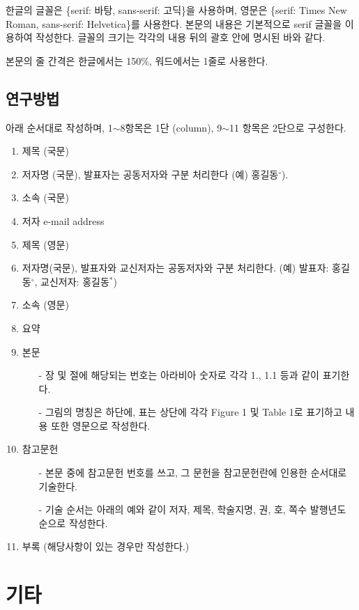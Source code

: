 \documentclass[a4paper,twocolumn]{article}
\begin{document}
한글의 글꼴은 \{serif: 바탕, sans-serif: 고딕\}을 사용하며, 
영문은 \{serif: Times New Roman, sans-serif: Helvetica\}를 사용한다. 
본문의 내용은 기본적으로 serif 글꼴을 이용하여 작성한다.
글꼴의 크기는 각각의 내용 뒤의 괄호 안에 명시된 바와 같다.

본문의 줄 간격은 한글에서는 150\%, 워드에서는 1줄로 사용한다.


\subsection{연구방법}
\label{subsec:methods}

아래 순서대로 작성하며, 1$\sim$8항목은 1단 (column), 
9$\sim$11 항목은 2단으로 구성한다.

\begin{enumerate}
	\item 제목 (국문)
	\item 저자명 (국문), 발표자는 공동저자와 구분 처리한다 (예) 홍길동$^{\circ}$).
	\item 소속 (국문)
	\item 저자 e-mail address
	\item 제목 (영문)
	\item 저자명(국문), 발표자와 교신저자는 공동저자와 구분 처리한다. (예) 발표자: 홍길동$^{\circ}$, 교신저자: 홍길동$^{*}$)
	\item 소속 (영문)
	\item 요약
	\item 본문
	\begin{itemize}
		\item[-] 장 및 절에 해당되는 번호는 아라비아 숫자로 각각 1., 1.1 등과 같이 표기한다.
		\item[-] 그림의 명칭은 하단에, 표는 상단에 각각 Figure 1 및 Table 1로 표기하고 내용 또한 영문으로 작성한다.
	\end{itemize}
	\item 참고문헌
	\begin{itemize}
		\item[-] 본문 중에 참고문헌 번호를 쓰고, 그 문헌을 참고문헌란에 인용한 순서대로 기술한다.
		\item[-] 기술 순서는 아래의 예와 같이 저자, 제목, 학술지명, 권, 호, 쪽수 발행년도 순으로 작성한다.
	\end{itemize}
	\item 부록 (해당사항이 있는 경우만 작성한다.)
\end{enumerate}


\section{기타}
\label{sec:misc}
\end{document}
